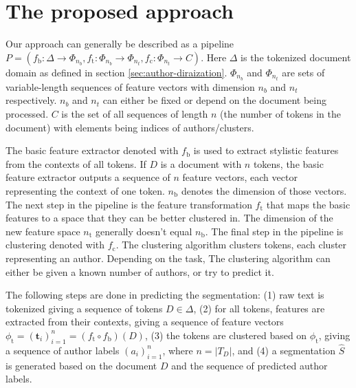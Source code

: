 \documentclass[10pt, a4paper]{article}
\begin{document}
\section{The proposed approach}

Our approach can generally be described as a pipeline $P = (f_\mathrm{b}:\Delta\rightarrow \Phi_{n_b}, f_\mathrm{t}:\Phi_{n_b}\rightarrow \Phi_{n_t}, f_\mathrm{c}:\Phi_{n_t}\rightarrow C)$. Here $\Delta$ is the tokenized document domain as defined in section \ref{sec:author-diraization}. $\Phi_{n_b}$ and $\Phi_{n_t}$ are sets of variable-length sequences of feature vectors with dimension $n_b$ and $n_t$ respectively. $n_b$ and $n_t$ can either be fixed or depend on the document being processed. $C$ is the set of all sequences of length $n$ (the number of tokens in the document) with elements being indices of authors/clusters.

The basic feature extractor denoted with $f_\mathrm{b}$ is used to extract stylistic features from the contexts of all tokens. If $D$ is a document with $n$ tokens, the basic feature extractor outputs a sequence of $n$ feature vectors, each vector representing the context of one token. $n_\mathrm{b}$ denotes the dimension of those vectors. The next step in the pipeline is the feature transformation $f_\mathrm{t}$ that maps the basic features to a space that they can be better clustered in. The dimension of the new feature space $n_\mathrm{t}$ generally doesn't equal $n_\mathrm{b}$. The final step in the pipeline is clustering denoted with $f_\mathrm{c}$. The clustering algorithm clusters tokens, each cluster representing an author. Depending on the task, The clustering algorithm can either be given a known number of authors, or try to predict it.

The following steps are done in predicting the segmentation: (1) raw text is tokenized giving a sequence of tokens $D\in\Delta$, (2) for all tokens, features are extracted from their contexts, giving a sequence of feature vectors $\phi_\mathrm{t} = (\mathbf{t}_i)_{i=1}^n = (f_\mathrm{t}\circ f_\mathrm{b})(D)$, (3) the tokens are clustered based on $\phi_\mathrm{t}$, giving a sequence of author labels $(a_i)_{i=1}^{n}$, where $n=|T_D|$, and (4) a segmentation $\hat{S}$ is generated based on the document $D$ and the sequence of predicted author labels.
\end{document}
